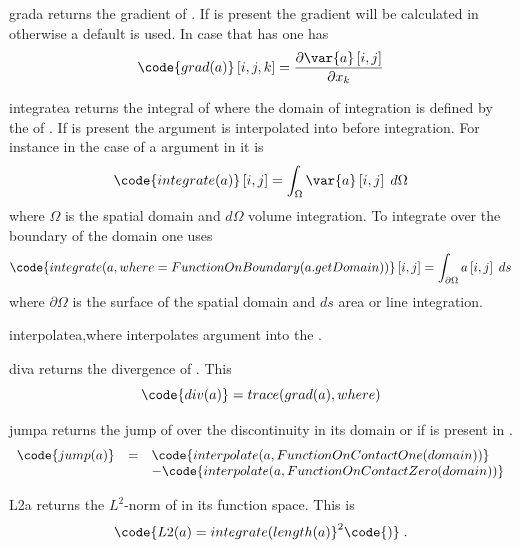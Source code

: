 \begin{funcdesc}{grad}{a}
returns the gradient of . If  is present the gradient will be calculated in \FunctionSpace {} otherwise a
default \FunctionSpace is used. In case that  has \RankTwo one has
\begin{equation}
\code{grad(a)}\left[i,j,k\right]=\frac{\partial \var{a} \left[i,j\right]}{\partial x_{k}}
\end{equation}
\end{funcdesc}
\begin{funcdesc}{integrate}{a}
returns the integral of  where the domain of integration is defined by the \FunctionSpace of . If  is
present the argument is interpolated into \FunctionSpace {} before integration. For instance in the case of
a \RankTwo argument in \ContinuousFunction it is
\begin{equation}
\code{integrate(a)}\left[i,j\right]=\int_{\Omega}\var{a} \left[i,j\right] \; d\Omega
\end{equation}
where $\Omega$ is the spatial domain and $d\Omega$ volume integration. To integrate over the boundary of the domain one uses
\begin{equation}
\code{integrate(a,where=FunctionOnBoundary(a.getDomain))}\left[i,j\right]=\int_{\partial \Omega} a\left[i,j\right] \; ds
\end{equation}
where $\partial \Omega$ is the surface of the spatial domain and $ds$ area or line integration.
\end{funcdesc}
\begin{funcdesc}{interpolate}{a,where}
interpolates argument  into the \FunctionSpace {}.
\end{funcdesc}
\begin{funcdesc}{div}{a}
returns the divergence of . This
\begin{equation}
\code{div(a)}=trace(grad(a),where)
\end{equation}
\end{funcdesc}
\begin{funcdesc}{jump}{a}
returns the jump of  over the discontinuity in its domain or if \Domain {} is present
in .
\begin{equation}
\begin{array}{rcl}
\code{jump(a)}& = &\code{interpolate(a,FunctionOnContactOne(domain))} \\
              &   & \hfill - \code{interpolate(a,FunctionOnContactZero(domain))}
\end{array}
\end{equation}
\end{funcdesc}
\begin{funcdesc}{L2}{a}
returns the $L^2$-norm of  in its function space. This is
\begin{equation}
\code{L2(a)=integrate(length(a)}^2\code{)} \; .
\end{equation}
\end{funcdesc}

